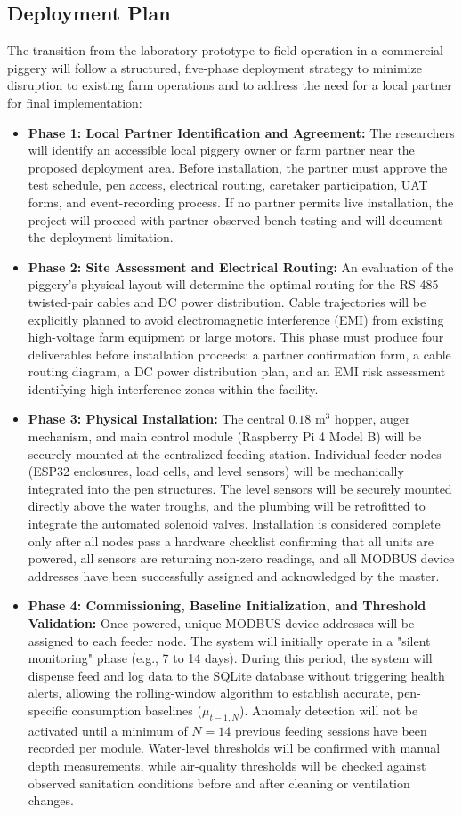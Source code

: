 \subsection{Deployment Plan}
The transition from the laboratory prototype to field operation in a commercial piggery will follow a structured, five-phase deployment strategy to minimize disruption to existing farm operations and to address the need for a local partner for final implementation:
\begin{itemize}
  \item \textbf{Phase 1: Local Partner Identification and Agreement:} The researchers will identify an accessible local piggery owner or farm partner near the proposed deployment area. Before installation, the partner must approve the test schedule, pen access, electrical routing, caretaker participation, UAT forms, and event-recording process. If no partner permits live installation, the project will proceed with partner-observed bench testing and will document the deployment limitation.
  \item \textbf{Phase 2: Site Assessment and Electrical Routing:} An evaluation of the piggery's physical layout will determine the optimal routing for the RS-485 twisted-pair cables and DC power distribution. Cable trajectories will be explicitly planned to avoid electromagnetic interference (EMI) from existing high-voltage farm equipment or large motors. This phase must produce four deliverables before installation proceeds: a partner confirmation form, a cable routing diagram, a DC power distribution plan, and an EMI risk assessment identifying high-interference zones within the facility.
  \item \textbf{Phase 3: Physical Installation:} The central $0.18\text{ m}^3$ hopper, auger mechanism, and main control module (Raspberry Pi 4 Model B) will be securely mounted at the centralized feeding station. Individual feeder nodes (ESP32 enclosures, load cells, and level sensors) will be mechanically integrated into the pen structures. The level sensors will be securely mounted directly above the water troughs, and the plumbing will be retrofitted to integrate the automated solenoid valves. Installation is considered complete only after all nodes pass a hardware checklist confirming that all units are powered, all sensors are returning non-zero readings, and all MODBUS device addresses have been successfully assigned and acknowledged by the master.
  \item \textbf{Phase 4: Commissioning, Baseline Initialization, and Threshold Validation:} Once powered, unique MODBUS device addresses will be assigned to each feeder node. The system will initially operate in a "silent monitoring" phase (e.g., 7 to 14 days). During this period, the system will dispense feed and log data to the SQLite database without triggering health alerts, allowing the rolling-window algorithm to establish accurate, pen-specific consumption baselines ($\mu_{t-1,N}$). Anomaly detection will not be activated until a minimum of $N = 14$ previous feeding sessions have been recorded per module. Water-level thresholds will be confirmed with manual depth measurements, while air-quality thresholds will be checked against observed sanitation conditions before and after cleaning or ventilation changes.

\end{itemize}
